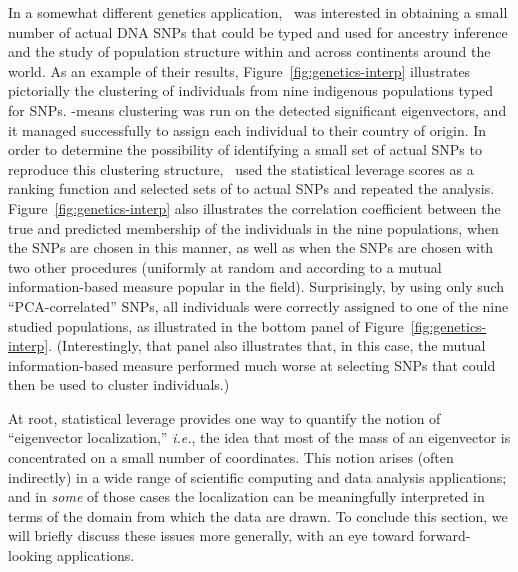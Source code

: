 \documentclass[twoside]{article}
\begin{document}
In a somewhat different genetics application,~\cite{Paschou07b} was 
interested in obtaining a small number of actual DNA SNPs that could be 
typed and used for ancestry inference and the study of population structure 
within and across continents around the world.
As an example of their results,
Figure~\ref{fig:genetics-interp} illustrates pictorially the clustering of 
individuals from nine indigenous populations typed for  SNPs. 
-means clustering was run on the detected significant eigenvectors, and 
it managed successfully to assign each individual to their country of origin.
In order to determine the possibility of identifying a small set of 
actual SNPs to reproduce this clustering structure,~\cite{Paschou07b} used 
the statistical leverage scores as a ranking function and selected sets of 
 to  actual SNPs and repeated the analysis.
Figure~\ref{fig:genetics-interp} also illustrates the correlation 
coefficient between the true and predicted membership of the individuals in 
the nine populations, when the SNPs are chosen in this manner, as well as 
when the SNPs are chosen with two other procedures (uniformly at random and 
according to a mutual information-based measure popular in the field).
Surprisingly, by using only  such ``PCA-correlated'' SNPs, all 
individuals were correctly assigned to one of the nine studied populations, 
as illustrated in the bottom panel of Figure~\ref{fig:genetics-interp}. 
(Interestingly, that panel also illustrates that, in this case, the mutual 
information-based measure performed much worse at selecting SNPs that could 
then be used to cluster individuals.)

At root, statistical leverage provides one way to quantify the notion of 
``eigenvector localization,'' \emph{i.e.}, the idea that most of the mass of 
an eigenvector is concentrated on a small number of coordinates.
This notion arises (often indirectly) in a wide range of scientific 
computing and data analysis applications; and in \emph{some} of those cases 
the localization can be meaningfully interpreted in terms of the domain from 
which the data are drawn.
To conclude this section, we will briefly discuss these issues more 
generally, with an eye toward forward-looking applications.
\end{document}
